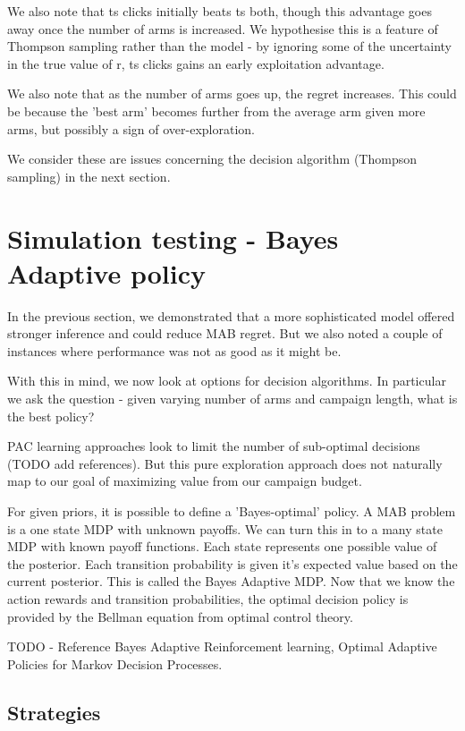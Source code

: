 \documentclass[12pt]{article}
\begin{document}
We also note that ts clicks initially beats ts both, though this advantage goes away once the number of arms is increased. We hypothesise this is a feature of Thompson sampling rather than the model - by ignoring some of the uncertainty in the true value of r, ts clicks gains an early exploitation advantage.

We also note that as the number of arms goes up, the regret increases. This could be because the 'best arm' becomes further from the average arm given more arms, but possibly a sign of over-exploration.

We consider these are issues concerning the decision algorithm (Thompson sampling) in the next section.

\pagebreak

\section{Simulation testing - Bayes Adaptive policy}

In the previous section, we demonstrated that a more sophisticated model offered stronger inference and could reduce MAB regret. But we also noted a couple of instances where performance was not as good as it might be. 

With this in mind, we now look at options for decision algorithms. In particular we ask the question - given varying number of arms and campaign length, what is the best policy? 

PAC learning approaches look to limit the number of sub-optimal decisions (TODO add references). But this pure exploration approach does not naturally map to our goal of maximizing value from our campaign budget.

For given priors, it is possible to define a 'Bayes-optimal' policy. A MAB problem is a one state MDP with unknown payoffs. We can turn this in to a many state MDP with known payoff functions. Each state represents one possible value of the posterior. Each transition probability is given it's expected value based on the current posterior. This is called the Bayes Adaptive MDP. Now that we know the action rewards and transition probabilities, the optimal decision policy is provided by the Bellman equation from optimal control theory.

TODO - Reference Bayes Adaptive Reinforcement learning,
Optimal Adaptive Policies for Markov Decision Processes.

\subsection{Strategies}
\end{document}
